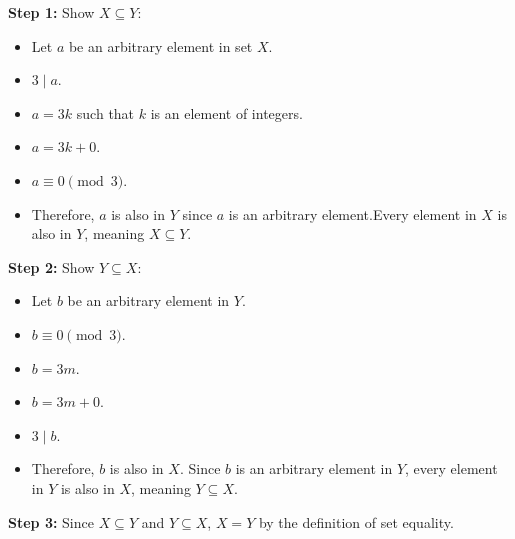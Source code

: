 \documentclass{article}
\begin{document}
    \textbf{Step 1:} Show $X \subseteq Y$:
        \begin{itemize}
            \item Let $a$ be an arbitrary element in set $X$.
            \item $3 \mid a$.
            \item $a = 3k$ such that $k$ is an element of integers.
            \item $a = 3k + 0$.
            \item $a \equiv 0 \pmod{3}$.
            \item Therefore, $a$ is also in $Y$ since $a$ is an arbitrary element.Every element in $X$ is also in $Y$, meaning $X \subseteq Y$.
        \end{itemize}
        \textbf{Step 2:} Show $Y \subseteq X$:
        \begin{itemize}
            \item Let $b$ be an arbitrary element in $Y$.
            \item $b \equiv 0 \pmod{3}$.
            \item $b = 3m$.
            \item $b = 3m + 0$.
            \item $3 \mid b$.
            \item Therefore, $b$ is also in $X$. Since $b$ is an arbitrary element in $Y$, every element in $Y$ is also in $X$, meaning $Y \subseteq X$.
        \end{itemize}
        \textbf{Step 3:} Since $X \subseteq Y$ and $Y \subseteq X$, $X = Y$ by the definition of set equality.
\end{document}
